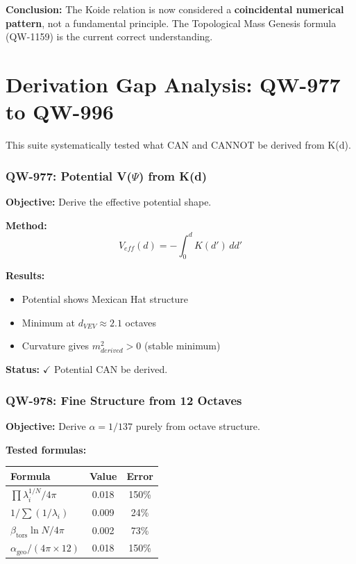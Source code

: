 \documentclass[11pt, a4paper]{article}
\theoremstyle{remark}
\newcommand{\alphageo}{\alpha_{\text{geo}}}
\newcommand{\betators}{\beta_{\text{tors}}}
\begin{document}
\textbf{Conclusion:} The Koide relation is now considered a \textbf{coincidental numerical pattern}, not a fundamental principle. The Topological Mass Genesis formula (QW-1159) is the current correct understanding.

\part{Derivation Gap Analysis: QW-977 to QW-996}

This suite systematically tested what CAN and CANNOT be derived from K(d).

\section{QW-977: Potential V($\Psi$) from K(d)}

\textbf{Objective:} Derive the effective potential shape.

\textbf{Method:}
\begin{equation}
V_{eff}(d) = -\int_0^d K(d') \, dd'
\end{equation}

\textbf{Results:}
\begin{itemize}
    \item Potential shows Mexican Hat structure
    \item Minimum at $d_{VEV} \approx 2.1$ octaves
    \item Curvature gives $m^2_{derived} > 0$ (stable minimum)
\end{itemize}

\textbf{Status:} $\checkmark$ Potential CAN be derived.

\section{QW-978: Fine Structure from 12 Octaves}

\textbf{Objective:} Derive $\alpha = 1/137$ purely from octave structure.

\textbf{Tested formulas:}
\begin{center}
\begin{tabular}{|l|c|c|}
\hline
\textbf{Formula} & \textbf{Value} & \textbf{Error} \\
\hline
$\prod\lambda_i^{1/N} / 4\pi$ & 0.018 & 150\% \\
$1 / \sum(1/\lambda_i)$ & 0.009 & 24\% \\
$\betators \ln N / 4\pi$ & 0.002 & 73\% \\
$\alphageo / (4\pi \times 12)$ & 0.018 & 150\% \\
\hline
\end{tabular}
\end{center}
\end{document}
